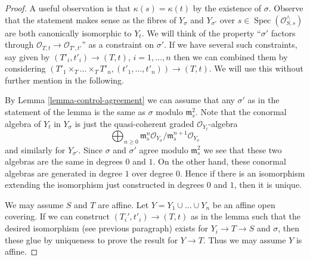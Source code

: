 \documentclass[10pt,a4paper]{amsart}
\theoremstyle{plain}
\theoremstyle{definition}
\theoremstyle{remark}
\numberwithin{equation}{subsection}
\def\Spec{\mathop{\mathrm{Spec}}}
\begin{document}
\begin{proof}
A useful observation is that $\kappa(s) = \kappa(t)$ by the existence of
$\sigma$. Observe that the statement makes sense as the fibres of $Y_\sigma$
and $Y_{\sigma'}$ over $s \in \Spec(\mathcal{O}_{S, s}^\wedge)$
are both canonically isomorphic to $Y_t$. We will think of the property
``$\sigma'$ factors through $\mathcal{O}_{T, t} \to \mathcal{O}_{T', t'}$''
as a constraint on $\sigma'$. If we have several such constraints,
say given by $(T'_i, t'_i) \to (T, t)$, $i = 1, \ldots, n$
then we can combined them by considering
$(T'_1 \times_T \ldots \times_T T'_n, (t'_1, \ldots, t'_n)) \to
(T, t)$. We will use this without further mention in the following.

\medskip\noindent
By Lemma \ref{lemma-control-agreement} we can assume that any $\sigma'$
as in the statement of the lemma is the same as $\sigma$ modulo
$\mathfrak m_s^2$. Note that the conormal algebra of $Y_t$ in
$Y_\sigma$ is just the quasi-coherent graded $\mathcal{O}_{Y_t}$-algebra
$$
\bigoplus\nolimits_{n \geq 0}
\mathfrak m_s^n\mathcal{O}_{Y_\sigma}/
\mathfrak m_s^{n + 1}\mathcal{O}_{Y_\sigma}
$$
and similarly for $Y_{\sigma'}$. Since $\sigma$ and $\sigma'$
agree modulo $\mathfrak m_s^2$ we see that these two algebras
are the same in degrees $0$ and $1$. On the other hand, these
conormal algebras are generated in degree $1$ over degree $0$.
Hence if there is an isomorphism extending the isomorphism
just constructed in degrees $0$ and $1$, then it is unique.

\medskip\noindent
We may assume $S$ and $T$ are affine. Let $Y = Y_1 \cup \ldots \cup Y_n$
be an affine open covering. If we can construct $(T_i', t'_i) \to (T, t)$
as in the lemma such that the desired isomorphism (see previous paragraph)
exists for $Y_i \to T \to S$ and $\sigma$, then these glue by
uniqueness to prove the result for $Y \to T$. Thus we may assume $Y$ is affine.


\end{proof}
\end{document}
